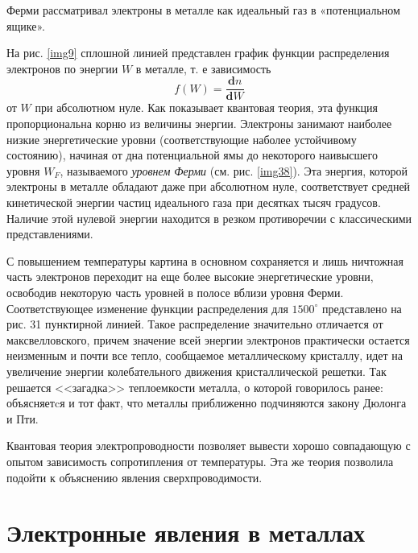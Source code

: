 \documentclass[a4paper,10pt]{book}
\begin{document}
Ферми рассматривал электроны в металле как идеальный газ в «потенциальном ящике». 

На рис. \ref{img9} сплошной линией представлен график функции распределения электронов по энергии $W$ в металле, т. е зависимость 
\begin{equation*}
 f(W) = \frac{\mathbf{d}n}{\mathbf{d}W}
\end{equation*}
от $W$ при абсолютном нуле. Как показывает квантовая теория, эта функция пропорциональна корню из величины энергии. Электроны занимают наиболее низкие энергетические уровни (соответствующие наболее устойчивому состоянию), начиная от дна потенциальной ямы до некоторого наивысшего уровня $W_F$, называемого \emph{уровнем Ферми} (см. рис. \ref{img38}). Эта энергия, которой электроны в металле обладают даже при абсолютном нуле, соответствует средней кинетической энергии частиц идеального газа при десятках тысяч градусов. Наличие этой нулевой энергии находится в резком противоречии с классическими представлениями. %

С повышением температуры картина в основном сохраняется и лишь ничтожная часть электронов переходит на еще более высокие энергетические уровни, освободив некоторую часть уровней в полосе вблизи уровня Ферми. Соответствующее изменение функции распределения для $1500^\circ$ представлено на рис. 31 пунктирной линией. Такое распределение значительно отличается от максвелловского, причем значение всей энергии электронов практически остается неизменным и почти все тепло, сообщаемое металлическому кристаллу, идет на увеличение энергии колебательного движения кристаллической решетки. Так решается <<загадка>> теплоемкости металла, о которой говорилось ранее: объясняетcя и тот факт, что металлы приближенно подчиняются закону Дюлонга и Пти. 

Квантовая теория электропроводности позволяет вывести хорошо совпадающую с опытом зависимость сопротипления от температуры. Эта же теория позволила подойти к объяснению явления сверхпроводимости.

\chapter{Электронные явления в металлах} 
\end{document}
